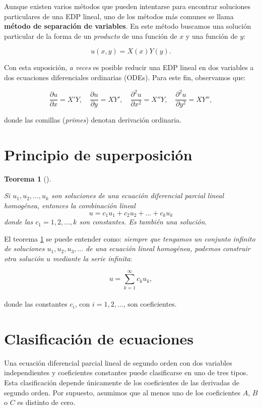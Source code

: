 \documentclass[
  spanish,
  us-letterpaper,
  DIV=11,
  numbers=noendperiod]{scrreprt}
\theoremstyle{definition}
\theoremstyle{plain}
\newtheorem{theorem}{Teorema}[chapter]
\theoremstyle{remark}
\begin{document}
Aunque existen varios métodos que pueden intentarse para encontrar
soluciones particulares de una EDP lineal, uno de los métodos más
comunes se llama \textbf{método de separación de variables}. En este
método buscamos una solución particular de la forma de un
\emph{producto} de una función de \(x\) y una función de \(y\):

\[
u(x, y) = X(x)Y(y).
\]

Con esta suposición, \emph{a veces} es posible reducir una EDP lineal en
dos variables a dos ecuaciones diferenciales ordinarias (ODEs). Para
este fin, observamos que:

\[
\dfrac{\partial u}{\partial x} = X'Y, \quad
\dfrac{\partial u}{\partial y} = XY', \quad
\dfrac{\partial^2 u}{\partial x^2} = X''Y, \quad
\dfrac{\partial^2 u}{\partial y^2} = XY'',
\]

donde las comillas (\emph{primes}) denotan derivación ordinaria.

\section{Principio de
superposición}\label{principio-de-superposiciuxf3n}

\begin{theorem}[]\protect\hypertarget{thm-superposition}{}\label{thm-superposition}

Si \(u_1 , u_2 , \dots , u_k\) son soluciones de una ecuación
diferencial parcial lineal homogénea, entonces la combinación lineal \[
u = c_1u_1 + c_2u_2 + \dots + c_ku_k
\] donde las \(c_1=1,2,\dots,k\) son constantes. Es también una
solución.

\end{theorem}

El teorema \ref{thm-superposition} se puede entender como: \emph{siempre
que tengamos un conjunto infinito de soluciones
\(u_1, u_2, u_3, \ldots\) de una ecuación lineal homogénea, podemos
construir otra solución \(u\) mediante la serie infinita}:

\[  
u = \sum_{k=1}^{\infty} c_k u_k,  
\]\\
donde las constantes \(c_i\), con \(i = 1, 2, \ldots\), son
coeficientes.

\section{Clasificación de
ecuaciones}\label{clasificaciuxf3n-de-ecuaciones}

Una ecuación diferencial parcial lineal de segundo orden con dos
variables independientes y coeficientes constantes puede clasificarse en
uno de tres tipos. Esta clasificación depende únicamente de los
coeficientes de las derivadas de segundo orden. Por supuesto, asumimos
que al menos uno de los coeficientes \(A\), \(B\) o \(C\) es distinto de
cero.
\end{document}
